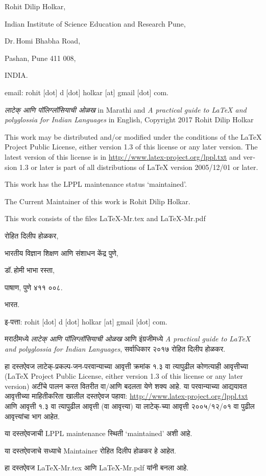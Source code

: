 \documentclass[11pt]{article}
\newcommand{\7}{\textbackslash}
\begin{document}
\begin{flushleft}
 \begin{english}
 {\Bask
 Rohit Dilip Holkar,

 Indian Institute of Science Education and Research Pune,

 Dr.\,Homi Bhabha Road,

 Pashan, Pune 411 008,

 INDIA.

 email: rohit [dot] d [dot] holkar [at] gmail [dot] com.
 \medskip
 
 { \small \emph{\Yvenu लाटेक् आणि पॉलिग्लॉसियाची ओळख} in Marathi and \emph{A
 practical guide to {\LaTeX} and polyglossia for Indian
 Languages} in English, Copyright {\Bask \textcopyright \@} 2017 Rohit Dilip Holkar

 This work may be distributed and/or modified under the
conditions of the LaTeX Project Public License, either version 1.3
of this license or any later version.
The latest version of this license is in
 \url{http://www.latex-project.org/lppl.txt}
and version 1.3 or later is part of all distributions of LaTeX
version 2005/12/01 or later.

This work has the LPPL maintenance status `maintained'.

The Current Maintainer of this work is Rohit Dilip Holkar.

This work consists of the files LaTeX-Mr.tex and LaTeX-Mr.pdf}}
\end{english}
\bigskip

 { \small
रोहित दिलीप होळकर,

भारतीय विज्ञान शिक्षण आणि संशाधन केंद्र पुणे,

डॉ.\,होमी भाभा रस्ता,

पाषाण, पुणे ४११ ००८.

भारत.

इ-पत्ता: {\Bask rohit [dot] d [dot] holkar [at] gmail [dot] com.}

 मराठीमध्ये \emph{\Yvenu लाटेक् आणि पॉलिग्लॉसियाची ओळख} आणि इंग्रजीमध्ये
 \emph{\Bask A
 practical guide to {\LaTeX} and polyglossia for Indian
 Languages}, सर्वाधिकार {\Bask \textcopyright \@} २०१७ रोहित दिलीप होळकर.

 हा दस्तऐवज लाटेक्-प्रकल्प-जन-परवान्याच्या आवृत्ती क्रमांक १.३ वा त्यापुढील कोणत्याही आवृत्तीच्या
 ({\Bask LaTeX Project Public License, either version 1.3 of this
 license or any later version})
 अटींचे पालन करत वितरीत वा/आणि बदलता येणे शक्य आहे. या परवान्याच्या
 आद्ययावत आवृत्तीच्या माहितीकरिता खालील दस्तऐवज पहावा:
 {\Bask \url{http://www.latex-project.org/lppl.txt}}
 आणि आवृत्ती १.३ वा त्यापुढील आवृत्ती (वा आवृत्त्या) या लाटेक्-च्या आवृत्ती २००५/१२/०१ वा पुढील आवृत्त्यांचा
 भाग आहेत.

 या दस्तऐवजाची {\Bask LPPL maintenance} स्थिती {\Bask `maintained'} अशी आहे.

 या दस्तऐवजाचे सध्याचे {\Bask Maintainer} रोहित दिलीप होळकर हे आहेत.

 हा दस्तऐवज {\Bask LaTeX-Mr.tex} आणि {\Bask LaTeX-Mr.pdf} यांनी बनला
 आहे.}
 \end{flushleft}
\end{document}
